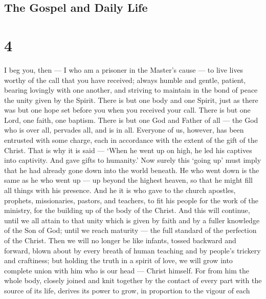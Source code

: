 \hypertarget{the-gospel-and-daily-life}{%
\subsection{The Gospel and Daily Life}\label{the-gospel-and-daily-life}}

\hypertarget{section-3}{%
\section{4}\label{section-3}}

 I beg you, then --- I who am a prisoner in the Master's
cause --- to live lives worthy of the call that you have received;
 always humble and gentle, patient, bearing lovingly with
one another,  and striving to maintain in the bond of peace
the unity given by the Spirit.  There is but one body and
one Spirit, just as there was but one hope set before you when you
received your call.  There is but one Lord, one faith, one
baptism.  There is but one God and Father of all --- the God
who is over all, pervades all, and is in all.  Everyone of
us, however, has been entrusted with some charge, each in accordance
with the extent of the gift of the Christ.  That is why it
is said --- `When he went up on high, he led his captives into
captivity. And gave gifts to humanity.'  Now surely this
`going up' must imply that he had already gone down into the world
beneath.  He who went down is the same as he who went up
--- up beyond the highest heaven, so that he might fill all things with
his presence.  And he it is who gave to the church
apostles, prophets, missionaries, pastors, and teachers, 
to fit his people for the work of the ministry, for the building up of
the body of the Christ.  And this will continue, until we
all attain to that unity which is given by faith and by a fuller
knowledge of the Son of God; until we reach maturity --- the full
standard of the perfection of the Christ.  Then we will no
longer be like infants, tossed backward and forward, blown about by
every breath of human teaching and by people's trickery and craftiness;
 but holding the truth in a spirit of love, we will grow
into complete union with him who is our head --- Christ himself.
 For from him the whole body, closely joined and knit
together by the contact of every part with the source of its life,
derives its power to grow, in proportion to the vigour of each
